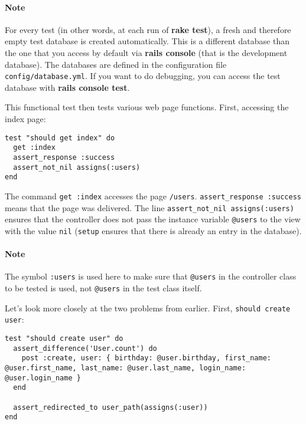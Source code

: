 \documentclass[a4paper]{book}
\newcounter{tab}[chapter]
\begin{document}
\paragraph{Note}\label{note-39}

For every test (in other words, at each run of \textbf{rake test}), a fresh and therefore empty test database is created automatically. This is a different database than the one that you access by default via \textbf{rails console} (that is the development database). The databases are defined in the configuration file \texttt{config/database.yml}. If you want to do debugging, you can access the test database with \textbf{rails console test}.

This functional test then tests various web page functions. First, accessing the index page:

\begin{shaded}\begin{verbatim}
test "should get index" do
  get :index
  assert_response :success
  assert_not_nil assigns(:users)
end
\end{verbatim}\end{shaded}

The command \texttt{get :index} accesses the page \texttt{/users}. \texttt{assert\_response :success} means that the page was delivered. The line \texttt{assert\_not\_nil assigns(:users)} ensures that the controller does not pass the instance variable \texttt{@users} to the view with the value \texttt{nil} (\texttt{setup} ensures that there is already an entry in the database).

\paragraph{Note}\label{note-40}

The symbol \texttt{:users} is used here to make sure that \texttt{@users} in the controller class to be tested is used, not \texttt{@users} in the test class itself.

Let's look more closely at the two problems from earlier. First, \texttt{should create user}:

\begin{shaded}\begin{verbatim}
test "should create user" do
  assert_difference('User.count') do
    post :create, user: { birthday: @user.birthday, first_name: @user.first_name, last_name: @user.last_name, login_name: @user.login_name }
  end

  assert_redirected_to user_path(assigns(:user))
end
\end{verbatim}\end{shaded}
\end{document}
